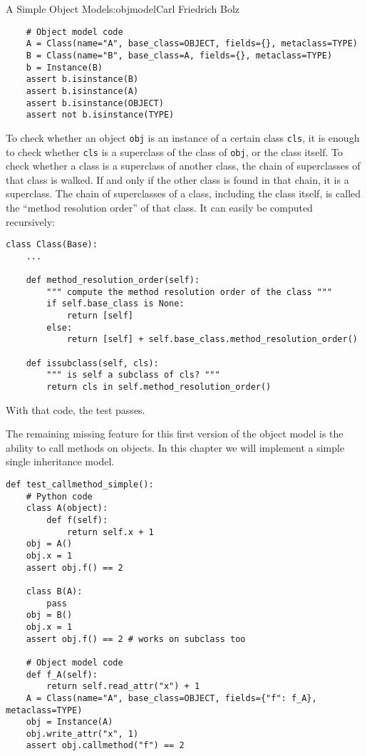 \begin{aosachapter}{A Simple Object Model}{s:objmodel}{Carl Friedrich Bolz}
\begin{verbatim}
    # Object model code
    A = Class(name="A", base_class=OBJECT, fields={}, metaclass=TYPE)
    B = Class(name="B", base_class=A, fields={}, metaclass=TYPE)
    b = Instance(B)
    assert b.isinstance(B)
    assert b.isinstance(A)
    assert b.isinstance(OBJECT)
    assert not b.isinstance(TYPE)
\end{verbatim}

To check whether an object \texttt{obj} is an instance of a certain
class \texttt{cls}, it is enough to check whether \texttt{cls} is a
superclass of the class of \texttt{obj}, or the class itself. To check
whether a class is a superclass of another class, the chain of
superclasses of that class is walked. If and only if the other class is
found in that chain, it is a superclass. The chain of superclasses of a
class, including the class itself, is called the ``method resolution
order'' of that class. It can easily be computed recursively:

\begin{verbatim}
class Class(Base):
    ...

    def method_resolution_order(self):
        """ compute the method resolution order of the class """
        if self.base_class is None:
            return [self]
        else:
            return [self] + self.base_class.method_resolution_order()

    def issubclass(self, cls):
        """ is self a subclass of cls? """
        return cls in self.method_resolution_order()
\end{verbatim}

With that code, the test passes.

\label{calling-methods}

The remaining missing feature for this first version of the object model
is the ability to call methods on objects. In this chapter we will
implement a simple single inheritance model.

\begin{verbatim}
def test_callmethod_simple():
    # Python code
    class A(object):
        def f(self):
            return self.x + 1
    obj = A()
    obj.x = 1
    assert obj.f() == 2

    class B(A):
        pass
    obj = B()
    obj.x = 1
    assert obj.f() == 2 # works on subclass too

    # Object model code
    def f_A(self):
        return self.read_attr("x") + 1
    A = Class(name="A", base_class=OBJECT, fields={"f": f_A}, metaclass=TYPE)
    obj = Instance(A)
    obj.write_attr("x", 1)
    assert obj.callmethod("f") == 2


\end{verbatim}
\end{aosachapter}
